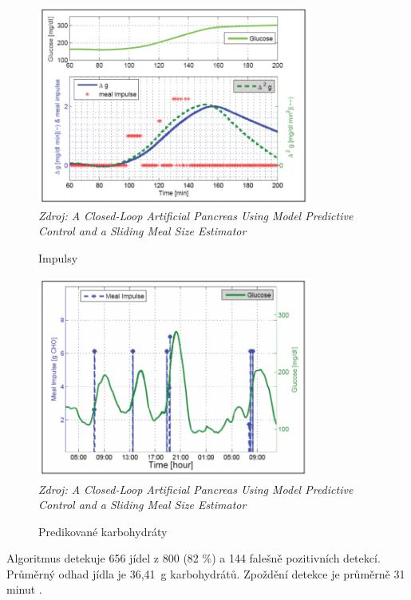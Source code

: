 \begin{figure}[H]
\caption{Impulsy}
\label{fig:analyza:threshold1}
\centering
\includegraphics[width=0.8\textwidth]{img/analyzaCHO/threshold1.png}\\
\textit{Zdroj: A Closed-Loop Artificial Pancreas Using Model Predictive Control and a Sliding Meal Size Estimator \citep{analyzaCHO.Thresholds}}
\end{figure}
\begin{figure}[H]
\caption{Predikované karbohydráty}
\label{fig:analyza:threshold2}
\centering
\includegraphics[width=0.8\textwidth]{img/analyzaCHO/threshold2.png}\\
\textit{Zdroj: A Closed-Loop Artificial Pancreas Using Model Predictive Control and a Sliding Meal Size Estimator \citep{analyzaCHO.Thresholds}}
\end{figure}

Algoritmus detekuje 656 jídel z 800 (82 \%) a 144 falešně pozitivních detekcí. Průměrný odhad jídla je 36,41~g karbohydrátů. Zpoždění detekce je průměrně 31 minut \citep{analyzaCHO.Thresholds}.


